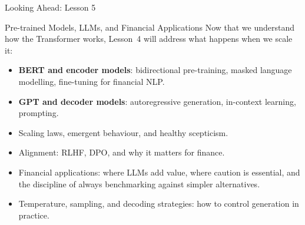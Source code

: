 \documentclass[aspectratio=169]{beamer}
\begin{document}
\begin{frame}{Looking Ahead: Lesson 5}
  \begin{block}{Pre-trained Models, LLMs, and Financial Applications}
    Now that we understand how the Transformer works, Lesson~4 will address what
    happens when we scale it:
  \end{block}
  \begin{itemize}
    \item \textbf{BERT and encoder models}: bidirectional pre-training, masked language
          modelling, fine-tuning for financial NLP.
    \item \textbf{GPT and decoder models}: autoregressive generation, in-context
          learning, prompting.
    \item Scaling laws, emergent behaviour, and healthy scepticism.
    \item Alignment: RLHF, DPO, and why it matters for finance.
    \item Financial applications: where LLMs add value, where caution is essential,
          and the discipline of always benchmarking against simpler alternatives.
    \item Temperature, sampling, and decoding strategies: how to control generation in
          practice.
  \end{itemize}
\end{frame}
%
%
\end{document}
